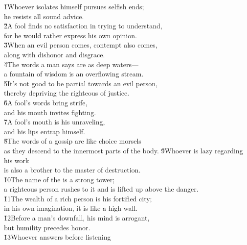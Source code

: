 \begin{poetry}
\poeml {}
\v{1}Whoever isolates himself pursues selfish ends; \\
\poeml he resists all sound advice. \\
\poeml \v{2}A fool finds no satisfaction in trying to understand, \\
\poemll    for he would rather express his own opinion. \\
\poeml \v{3}When an evil person comes, contempt also comes, \\
\poemll    along with dishonor and disgrace. \\
\poeml \v{4}The words a man says are as deep waters--- \\
\poemll    a fountain of wisdom is an overflowing stream. \\
\poeml \v{5}It's not good to be partial towards an evil person, \\
\poemll    thereby depriving the righteous of justice. \\
\poeml \v{6}A fool's words bring strife, \\
\poemll    and his mouth invites fighting. \\
\poeml \v{7}A fool's mouth is his unraveling, \\
\poemll    and his lips entrap himself. \\
\poeml \v{8}The words of a gossip are like choice morsels \\
\poemll    as they descend to the innermost parts of the body.
\poeml \v{9}Whoever is lazy regarding his work \\
\poemll    is also a brother to the master of destruction. \\
\poeml \v{10}The name of the  is a strong tower; \\
\poemll    a righteous person rushes to it and is lifted up above the danger. \\
\poeml \v{11}The wealth of a rich person is his fortified city; \\
\poemll    in his own imagination, it is like a high wall. \\
\poeml \v{12}Before a man's downfall, his mind is arrogant, \\
\poemll    but humility precedes honor. \\
\poeml \v{13}Whoever answers before listening \\

\end{poetry}
